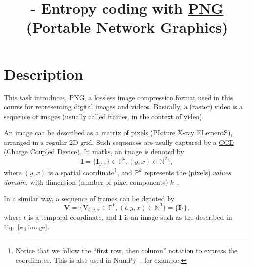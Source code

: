 


\title{\SM{} - Entropy coding with
  \href{https://vicente-gonzalez-ruiz.github.io/PNG/}{PNG} (Portable
  Network Graphics)}

\maketitle

\tableofcontents

\section{Description}

This task introduces,
\href{https://vicente-gonzalez-ruiz.github.io/PNG/}{PNG}, a
\href{https://en.wikipedia.org/wiki/Lossless_compression}{lossless
  image compression format} used in this course for representing
\href{https://en.wikipedia.org/wiki/Digital_data}{digital}
\href{https://en.wikipedia.org/wiki/Digital_image}{images} and
\href{https://en.wikipedia.org/wiki/Video}{videos}. Basically, a
(\href{https://en.wikipedia.org/wiki/Raster_graphics}{raster}) video
is a \href{https://en.wikipedia.org/wiki/Sequence}{sequence} of images
(usually called
\href{https://en.wikipedia.org/wiki/Film_frame}{frames}, in the
context of video).

An image can be described as a
\href{https://en.wikipedia.org/wiki/Matrix_(mathematics)}{matrix} of
\href{https://en.wikipedia.org/wiki/Pixel}{pixels} (PIcture X-ray
ELementS), arranged in a regular 2D grid. Such sequences are
usully captured by a
\href{https://en.wikipedia.org/wiki/Charge-coupled_device}{CCD (Charge
  Coupled Device)}. In maths, an image is denoted by
\begin{equation}
  {\mathbf I} = \{{\mathbf I}_{y,x}\}\in\mathbb{P}^{k}, (y,x)\in\mathbb{N}^2\},
  \label{eq:image}
\end{equation}
where $(y,x)$ is a spatial coordinate\footnote{Notice that we follow
the ``first row, then column'' notation to express the
coordinates. This is also used in NumPy~\cite{harris2020array}, for
example.}, and $\mathbb{P}^{k}$ represents the (pixels) \emph{values
domain}, with dimension (number of pixel components)
$k$~\cite{burger2016digital}.

In a similar way, a sequence of frames can be denoted by
\begin{equation}
  {\mathbf V} = \{{\mathbf V}_{t,y,x}\in\mathbb{P}^{k}, (t,y,x)\in\mathbb{N}^3\} = \{{\mathbf I}_t\},
  \label{eq:video}
\end{equation}
where $t$ is a temporal coordinate, and ${\mathbf I}$ is an image such
as the described in Eq.~\eqref{eq:image}.

